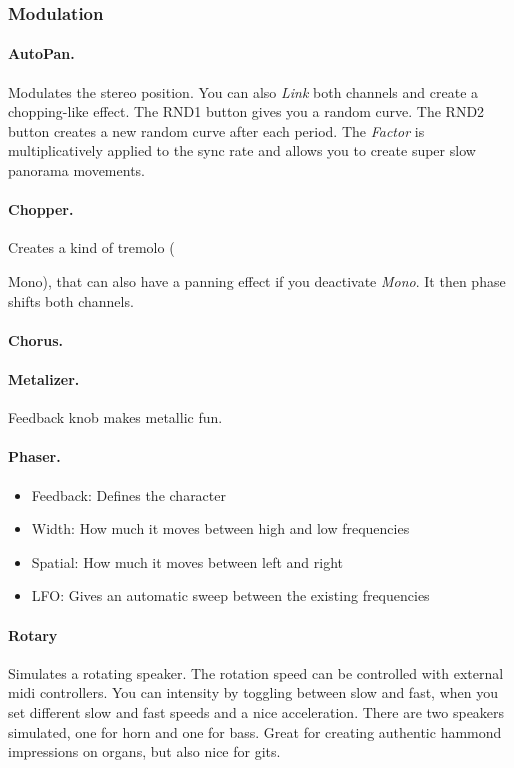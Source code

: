 \documentclass[10pt]{article}
\begin{document}
\subsubsection{Modulation}

\paragraph{AutoPan.} Modulates the stereo position. You can also \textit{Link} both channels and create a chopping-like effect. The RND1 button gives you a random curve. The RND2 button creates a new random curve after each period. The \textit{Factor} is multiplicatively applied to the sync rate and allows you to create super slow panorama movements.

\paragraph{Chopper.} Creates a kind of tremolo (\item Mono), that can also have a panning effect if you deactivate \textit{Mono}. It then phase shifts both channels.

\paragraph{Chorus.}

\paragraph{Metalizer.} Feedback knob makes metallic fun.

\paragraph{Phaser.}

\begin{itemize}
	\item Feedback: Defines the character
	\item Width: How much it moves between high and low frequencies
	\item Spatial: How much it moves between left and right
	\item LFO: Gives an automatic sweep between the existing frequencies
\end{itemize}

\paragraph{Rotary} Simulates a rotating speaker. The rotation speed can be controlled with external midi controllers. You can intensity by toggling between slow and fast, when you set different slow and fast speeds and a nice acceleration. There are two speakers simulated, one for horn and one for bass.
Great for creating authentic hammond impressions on organs, but also nice for gits.
\end{document}
